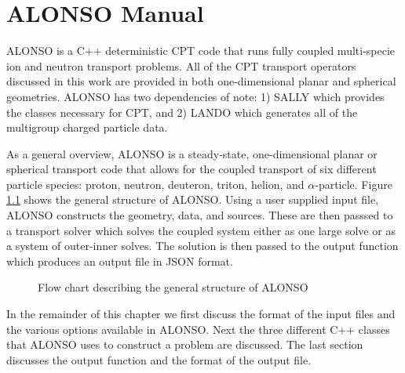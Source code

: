 \documentclass[../main.tex]{subfiles}
\begin{document}
\chapter{ALONSO Manual}
ALONSO is a C++ deterministic CPT code that runs fully coupled multi-specie ion and neutron transport problems. All of the CPT transport operators discussed in this work are provided in both one-dimensional planar and spherical geometries. ALONSO has two dependencies of note: 1) SALLY which provides the classes necessary for CPT, and 2) LANDO which generates all of the multigroup charged particle data.

As a general overview, ALONSO is a steady-state, one-dimensional planar or spherical transport code that allows for the coupled transport of six different particle species: proton, neutron, deuteron, triton, helion, and $\alpha$-particle. Figure \ref{fig:ALONSO_code_structure} shows the general structure of ALONSO. Using a user supplied input file, ALONSO constructs the geometry, data, and sources. These are then passsed to a transport solver which solves the coupled system either as one large solve or as a system of outer-inner solves. The solution is then passed to the output function which produces an output file in JSON format.

\begin{figure}[!htb]
  \centering
  \caption{Flow chart describing the general structure of ALONSO}
  \label{fig:ALONSO_code_structure}
\end{figure}

In the remainder of this chapter we first discuss the format of the input files and the various options available in ALONSO. Next the three different C++ classes that ALONSO uses to construct a problem are discussed. The last section discusses the output function and the format of the output file.














\end{document}
